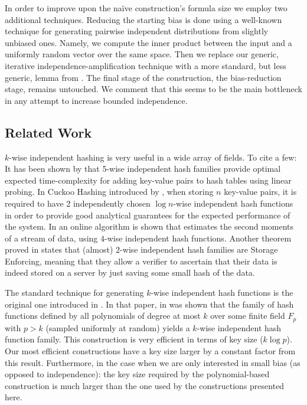 \documentclass[12pt]{article}
\begin{document}
	In order to improve upon the na\"{i}ve construction's formula size we employ two additional techniques.
	Reducing the starting bias is done using a well-known technique for generating pairwise independent distributions from slightly unbiased ones.
	Namely, we compute the inner product between the input and a uniformly random vector over the same space.
	Then we replace our generic, iterative independence-amplification technique with a more standard, but less generic, lemma from \cite{ValVaz}.
	The final stage of the construction, the bias-reduction stage, remains untouched.
	We comment that this seems to be the main bottleneck in any attempt to increase bounded independence.
	
	\subsection{Related Work} \label{section: related work}

	$k$-wise independent hashing is very useful in a wide array of fields. To cite a few:
	It has been shown by \cite{5LinearProbing} that 5-wise independent hash families provide optimal expected time-complexity for adding key-value pairs to hash tables using linear probing.
	In Cuckoo Hashing introduced by \cite{CuckooHashing}, when storing $n$ key-value pairs, it is required to have 2 independently chosen $\log n$-wise independent hash functions in order to provide good analytical guarantees for the expected performance of the system.
	In \cite{4UniversalSecondMoment} an online algorithm is shown that estimates the second moments of a stream of data, using $4$-wise independent hash functions.
	Another theorem proved in \cite{StorageEnforcing} states that (almost) $2$-wise independent hash families are Storage Enforcing, meaning that they allow a verifier to ascertain that their data is indeed stored on a server by just saving some small hash of the data.
	
	The standard technique for generating $k$-wise independent hash functions is the original one introduced in \cite{K-Indenepdence}.
	In that paper, in was shown that the family of hash functions defined by all polynomials of degree at most $k$ over some finite field $F_p$ with $p > k$ (sampled uniformly at random) yields a $k$-wise independent hash function family.
	This construction is very efficient in terms of key size ($k \log p$).
	Our most efficient constructions have a key size larger by a constant factor from this result.
	Furthermore, in the case when we are only interested in small bias (as opposed to independence): the key size required by the polynomial-based construction is much larger than the one used by the constructions presented here.
	
\end{document}
